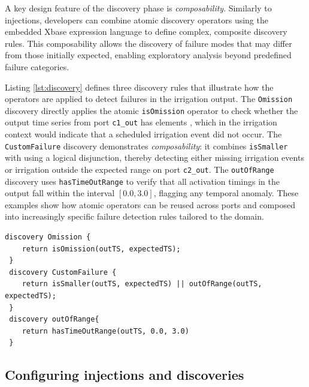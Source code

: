 A key design feature of the discovery phase is \textit{composability}. Similarly to injections, developers can combine atomic discovery operators using the embedded Xbase expression language to define complex, composite discovery rules. This composability allows the discovery of failure modes that may differ from those initially expected, enabling exploratory analysis beyond predefined failure categories. %

Listing \ref{lst:discovery} defines three discovery rules that illustrate how the operators are applied to detect failures in the irrigation output. The \texttt{Omission} discovery directly applies the atomic \texttt{isOmission} operator to check whether the output time series from port \texttt{c1\_out} has  %
elements  %
, which in the irrigation context would indicate that a scheduled irrigation event did not occur. The \texttt{CustomFailure} discovery demonstrates \textit{composability}: it combines \texttt{isSmaller} %
with  %
using a logical disjunction, thereby detecting either missing irrigation events or irrigation  %
outside the expected %
 range on port \texttt{c2\_out}. The \texttt{outOfRange} discovery uses \texttt{hasTimeOutRange} to verify that all activation timings in the output fall within the interval $[0.0, 3.0]$, flagging any temporal anomaly. These examples show how atomic operators can be reused across ports and composed into increasingly specific failure detection rules tailored to the domain.

\begin{lstlisting}[style=JavaStyle,caption=Specification of the discovery rules.,label=lst:discovery]
 discovery Omission {
 	return isOmission(outTS, expectedTS);
 }
 discovery CustomFailure {
 	return isSmaller(outTS, expectedTS) || outOfRange(outTS, expectedTS);
 }
 discovery outOfRange{
 	return hasTimeOutRange(outTS, 0.0, 3.0)
 }
\end{lstlisting}


\subsection{Configuring injections and discoveries}

